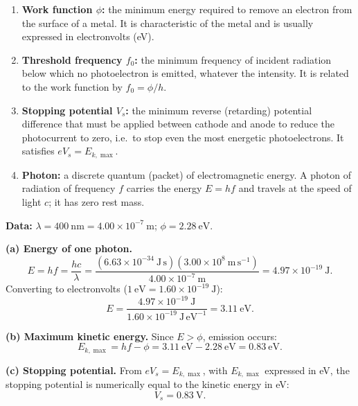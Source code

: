 \documentclass[11pt]{article}
\begin{document}
\begin{corrige}
\begin{enumerate}
\item \textbf{Work function $\phi$:} the minimum energy required to remove an electron from the surface of a metal. It is characteristic of the metal and is usually expressed in electronvolts (eV).
\item \textbf{Threshold frequency $f_0$:} the minimum frequency of incident radiation below which no photoelectron is emitted, whatever the intensity. It is related to the work function by $f_0 = \phi/h$.
\item \textbf{Stopping potential $V_s$:} the minimum reverse (retarding) potential difference that must be applied between cathode and anode to reduce the photocurrent to zero, i.e.\ to stop even the most energetic photoelectrons. It satisfies $eV_s = E_{k,\max}$.
\item \textbf{Photon:} a discrete quantum (packet) of electromagnetic energy. A photon of radiation of frequency $f$ carries the energy $E = hf$ and travels at the speed of light $c$; it has zero rest mass.
\end{enumerate}
\end{corrige}

\begin{corrige}
\textbf{Data:} $\lambda = 400\ \mathrm{nm} = 4.00\times 10^{-7}\ \mathrm{m}$; $\phi = 2.28\ \mathrm{eV}$.

\textbf{(a) Energy of one photon.}
\[ E = hf = \frac{hc}{\lambda} = \frac{(6.63\times 10^{-34}\ \mathrm{J\,s})(3.00\times 10^{8}\ \mathrm{m\,s^{-1}})}{4.00\times 10^{-7}\ \mathrm{m}} = 4.97\times 10^{-19}\ \mathrm{J}. \]
Converting to electronvolts ($1\ \mathrm{eV} = 1.60\times 10^{-19}\ \mathrm{J}$):
\[ E = \frac{4.97\times 10^{-19}\ \mathrm{J}}{1.60\times 10^{-19}\ \mathrm{J\,eV^{-1}}} = 3.11\ \mathrm{eV}. \]

\textbf{(b) Maximum kinetic energy.} Since $E > \phi$, emission occurs:
\[ E_{k,\max} = hf - \phi = 3.11\ \mathrm{eV} - 2.28\ \mathrm{eV} = 0.83\ \mathrm{eV}. \]

\textbf{(c) Stopping potential.} From $eV_s = E_{k,\max}$, with $E_{k,\max}$ expressed in eV, the stopping potential is numerically equal to the kinetic energy in eV:
\[ V_s = 0.83\ \mathrm{V}. \]
\end{corrige}
\end{document}

